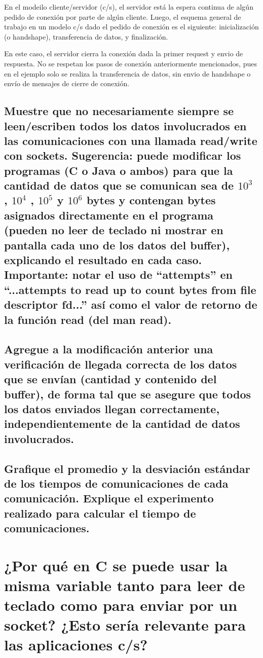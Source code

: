 \documentclass[osajnl,twocolumn,showpacs,superscriptaddress,10pt]{revtex4-1} %
\begin{document}
En el modeilo cliente/servidor (c/s), el servidor está  la espera continua de algún pedido de conexión por parte de algún cliente. Luego, el esquema general de trabajo en un modelo c/s dado el pedido de conexión es el siguiente: inicialización (o handshape), transferencia de datos, y finalización.

En este caso, el servidor cierra la conexión dada la primer request y envio de respuesta. No se respetan los pasos de conexión anteriormente mencionados, pues en el ejemplo solo se realiza la transferencia de datos, sin envio de handshape o envío de mensajes de cierre de conexión.

\subsection{Muestre que no necesariamente siempre se leen/escriben todos los datos involucrados en las comunicaciones con una llamada read/write con sockets. Sugerencia: puede modificar los programas (C o Java o ambos) para que la cantidad de datos que se comunican sea de $10^3$ , $10^4$ , $10^5$ y $10^6$ bytes y contengan bytes asignados directamente en el programa (pueden no leer de teclado ni mostrar en pantalla cada uno de los datos del buffer), explicando el resultado en cada caso. Importante: notar el uso de “attempts” en “...attempts to read up to count bytes from file descriptor fd...” así como el valor de retorno de la función read (del man read).}

\subsection{Agregue a la modificación anterior una verificación de llegada correcta de los datos que se envían (cantidad y contenido del buffer), de forma tal que se asegure que todos los datos enviados llegan correctamente, independientemente de la cantidad de datos involucrados.}

\subsection{Grafique el promedio y la desviación estándar de los tiempos de comunicaciones de cada comunicación. Explique el experimento realizado para calcular el tiempo de comunicaciones.}

\section{¿Por qué en C se puede usar la misma variable tanto para leer de teclado como para enviar por un socket? ¿Esto sería relevante para las aplicaciones c/s?}
\end{document}
